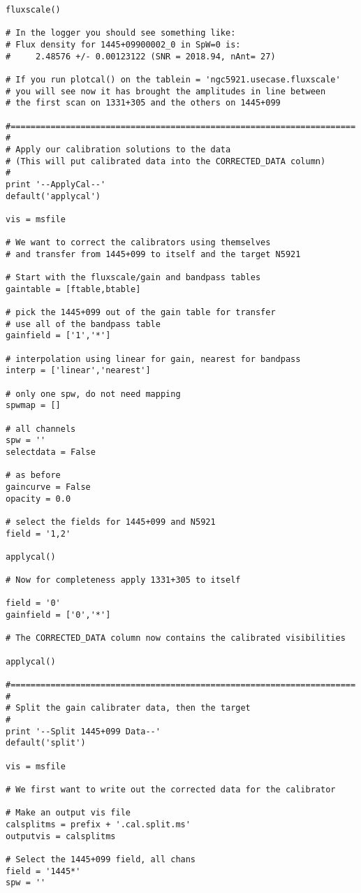\begin{verbatim}
fluxscale()

# In the logger you should see something like:
# Flux density for 1445+09900002_0 in SpW=0 is:
#     2.48576 +/- 0.00123122 (SNR = 2018.94, nAnt= 27)

# If you run plotcal() on the tablein = 'ngc5921.usecase.fluxscale'
# you will see now it has brought the amplitudes in line between
# the first scan on 1331+305 and the others on 1445+099

#=====================================================================
#
# Apply our calibration solutions to the data
# (This will put calibrated data into the CORRECTED_DATA column)
#
print '--ApplyCal--'
default('applycal')

vis = msfile

# We want to correct the calibrators using themselves
# and transfer from 1445+099 to itself and the target N5921

# Start with the fluxscale/gain and bandpass tables
gaintable = [ftable,btable]

# pick the 1445+099 out of the gain table for transfer
# use all of the bandpass table
gainfield = ['1','*']

# interpolation using linear for gain, nearest for bandpass
interp = ['linear','nearest']

# only one spw, do not need mapping
spwmap = []

# all channels
spw = ''
selectdata = False

# as before
gaincurve = False
opacity = 0.0

# select the fields for 1445+099 and N5921
field = '1,2'

applycal()

# Now for completeness apply 1331+305 to itself

field = '0'
gainfield = ['0','*']

# The CORRECTED_DATA column now contains the calibrated visibilities

applycal()

#=====================================================================
#
# Split the gain calibrater data, then the target
#
print '--Split 1445+099 Data--'
default('split')

vis = msfile

# We first want to write out the corrected data for the calibrator

# Make an output vis file
calsplitms = prefix + '.cal.split.ms'
outputvis = calsplitms

# Select the 1445+099 field, all chans
field = '1445*'
spw = ''


\end{verbatim}

